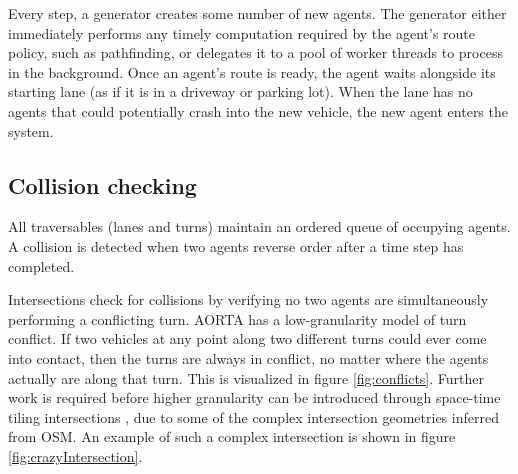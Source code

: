 \documentclass[letterpaper, 10 pt, conference]{ieeeconf}  %
\begin{document}
Every step, a generator creates some number of new agents. The generator either
immediately performs any timely computation required by the agent's route
policy, such as pathfinding, or delegates it to a pool of worker threads to
process in the background.  Once an agent's route is ready, the agent waits
alongside its starting lane (as if it is in a driveway or parking lot). When the
lane has no agents that could potentially crash into the new vehicle, the new
agent enters the system.

\subsection{Collision checking}

All traversables (lanes and turns) maintain an ordered queue of occupying
agents. A collision is detected when two agents reverse order after a time step
has completed.

Intersections check for collisions by verifying no two agents are simultaneously
performing a conflicting turn. AORTA has a low-granularity model of turn
conflict. If two vehicles at any point along two different turns could ever come
into contact, then the turns are always in conflict, no matter where the agents
actually are along that turn. This is visualized in figure \ref{fig:conflicts}.
Further work is required before higher granularity can be introduced through
space-time tiling intersections \cite{JAIR08-dresner}, due to some of the
complex intersection geometries inferred from OSM. An example of such a complex
intersection is shown in figure \ref{fig:crazyIntersection}.

\end{document}
